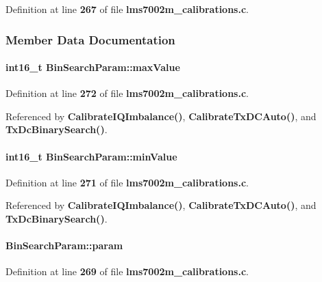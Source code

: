 Definition at line {\bf 267} of file {\bf lms7002m\+\_\+calibrations.\+c}.



\subsubsection{Member Data Documentation}
\paragraph[{max\+Value}]{\setlength{\rightskip}{0pt plus 5cm}int16\+\_\+t Bin\+Search\+Param\+::max\+Value}\label{structBinSearchParam_add0d8984a5ab28d5daba22404e8c3eb3}


Definition at line {\bf 272} of file {\bf lms7002m\+\_\+calibrations.\+c}.



Referenced by {\bf Calibrate\+I\+Q\+Imbalance()}, {\bf Calibrate\+Tx\+D\+C\+Auto()}, and {\bf Tx\+Dc\+Binary\+Search()}.

\paragraph[{min\+Value}]{\setlength{\rightskip}{0pt plus 5cm}int16\+\_\+t Bin\+Search\+Param\+::min\+Value}\label{structBinSearchParam_acaf7e8c3b5df609b9774e9d0558a3b3b}


Definition at line {\bf 271} of file {\bf lms7002m\+\_\+calibrations.\+c}.



Referenced by {\bf Calibrate\+I\+Q\+Imbalance()}, {\bf Calibrate\+Tx\+D\+C\+Auto()}, and {\bf Tx\+Dc\+Binary\+Search()}.

\paragraph[{param}]{ Bin\+Search\+Param\+::param}\label{structBinSearchParam_a8e051ce531c9332403d12a6de3a54890}


Definition at line {\bf 269} of file {\bf lms7002m\+\_\+calibrations.\+c}.



